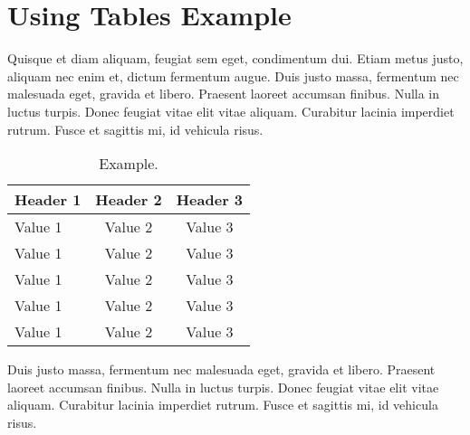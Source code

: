%
%
%

\section{\label{sec:usingtables}Using Tables Example}

Quisque et diam aliquam, feugiat sem eget, condimentum dui. Etiam metus justo, aliquam nec enim et, dictum fermentum
augue. Duis justo massa, fermentum nec malesuada eget, gravida et libero. Praesent laoreet accumsan finibus. Nulla in
luctus turpis. Donec feugiat vitae elit vitae aliquam. Curabitur lacinia imperdiet rutrum. Fusce et sagittis mi, id
vehicula risus.

\begin{table}[h!]\label{tab:tableexample}
	\begin{center}
		\caption{Example.}
		\begin{tabular}{l|c|c}
			\hline
			Header 1 & Header 2 & Header 3 \\
			\hline \hline
			Value 1  & Value 2  & Value 3  \\
			Value 1  & Value 2  & Value 3  \\
			Value 1  & Value 2  & Value 3  \\
			Value 1  & Value 2  & Value 3  \\
			Value 1  & Value 2  & Value 3  \\
			\hline
		\end{tabular}
	\end{center}
\end{table}

Duis justo massa, fermentum nec malesuada eget, gravida et libero. Praesent laoreet accumsan finibus. Nulla in luctus
turpis. Donec feugiat vitae elit vitae aliquam. Curabitur lacinia imperdiet rutrum. Fusce et sagittis mi, id vehicula
risus.
